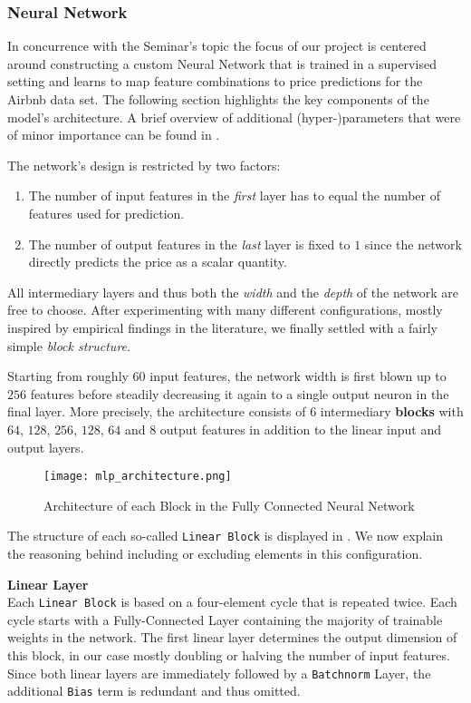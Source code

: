 \subsubsection{Neural Network} \label{neural-network}

In concurrence with the Seminar's topic the focus of our project is centered around constructing a custom Neural Network that is trained in a supervised setting and learns to map feature combinations to price predictions for the Airbnb data set.
The following section highlights the key components of the model's architecture.
A brief overview of additional (hyper-)parameters that were of minor importance can be found in .

The network's design is restricted by two factors:
\begin{enumerate}
  \item The number of input features in the \emph{first} layer has to equal the number of features used for prediction.
  \item The number of output features in the \emph{last} layer is fixed to $1$ since the network directly predicts the price as a scalar quantity.
\end{enumerate}
All intermediary layers and thus both the \emph{width} and the \emph{depth} of the network are free to choose.
After experimenting with many different configurations, mostly inspired by empirical findings in the literature, we finally settled with a fairly simple \emph{block structure}.

Starting from roughly $60$ input features, the network width is first blown up to $256$ features before steadily decreasing it again to a single output neuron in the final layer.
More precisely, the architecture consists of $6$ intermediary \textbf{blocks} with $64$, $128$, $256$, $128$, $64$ and $8$ output features in addition to the linear input and output layers.

\begin{figure}[t]
  \centering
  \texttt{[image: mlp\_architecture.png]}
  \caption{Architecture of each Block in the Fully Connected Neural Network}
  \label{fig:linear-block}
\end{figure}

The structure of each so-called \texttt{Linear Block} is displayed in .
We now explain the reasoning behind including or excluding elements in this configuration.

\textbf{Linear Layer} \\
Each \texttt{Linear Block} is based on a four-element cycle that is repeated twice.
Each cycle starts with a Fully-Connected Layer containing the majority of trainable weights in the network.
The first linear layer determines the output dimension of this block, in our case mostly doubling or halving the number of input features.
Since both linear layers are immediately followed by a \texttt{Batchnorm} Layer, the additional \texttt{Bias} term is redundant and thus omitted.

